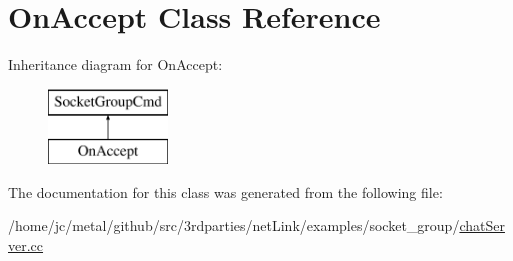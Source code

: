 \hypertarget{classOnAccept}{}\section{On\+Accept Class Reference}
\label{classOnAccept}
Inheritance diagram for On\+Accept\+:\begin{figure}[H]
\begin{center}
\leavevmode
\includegraphics[height=2.000000cm]{classOnAccept}
\end{center}
\end{figure}


The documentation for this class was generated from the following file\+:\begin{DoxyCompactItemize}
\item 
/home/jc/metal/github/src/3rdparties/net\+Link/examples/socket\+\_\+group/\hyperlink{chatServer_8cc}{chat\+Server.\+cc}\end{DoxyCompactItemize}
